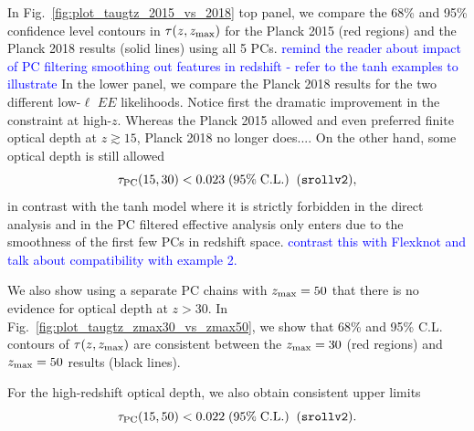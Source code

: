 \documentclass[prd,twocolumn,amsmath,amssymb,floatfix,superscriptaddress,nofootinbib]{revtex4-1}
\newcommand{\zmax}{z_{\rm max}}
\newcommand{\beq}{\begin{equation}}
\newcommand{\eeq}{\end{equation}}
\newcommand{\wh}[1]{\textcolor{blue}{#1}}
\begin{document}
{{In Fig.~\ref{fig:plot_taugtz_2015_vs_2018} top panel, we compare the 68\% and 95\% confidence level contours in $\tau(z, \zmax)$ for the Planck 2015 (red regions) and the Planck 2018 results (solid lines) using all 5 PCs.
\wh{remind the reader about impact of PC filtering smoothing out features in redshift - refer to the tanh examples to illustrate}
In the lower panel, we compare the Planck 2018 results for the two different low-$\ell$ $EE$ likelihoods.   Notice first the dramatic improvement in the
constraint at high-$z$.  Whereas the Planck 2015 allowed and even preferred
finite optical depth at $z\gtrsim 15$, Planck 2018 no longer does....
On the other hand, some optical depth is still allowed 
\beq
\tau_{\rm PC}(15, 30) < 0.023 \; (95\%\; \mathrm{C.L.})\;\;(\texttt{srollv2}),
\eeq
in contrast with the tanh model where it is strictly forbidden in the direct analysis and in the PC filtered effective analysis only enters due to the smoothness of the first few PCs in redshift space.
\wh{contrast this with Flexknot and talk about compatibility with example 2.}


We also show using a separate PC chains with $\zmax = 50$ that there is no evidence for optical depth at $z>30$. 
In Fig.~\ref{fig:plot_taugtz_zmax30_vs_zmax50}, we show that 68\% and 95\% C.L. contours of $\tau(z, \zmax)$ are consistent between the $\zmax = 30$ (red regions) and $\zmax = 50$ results (black lines).

%
%

For the high-redshift optical depth, we also obtain consistent upper limits
\beq
\tau_{\rm PC}(15, 50) < 0.022 \; (95\%\; \mathrm{C.L.})\;\;(\texttt{srollv2}).
\eeq

}}
\end{document}
